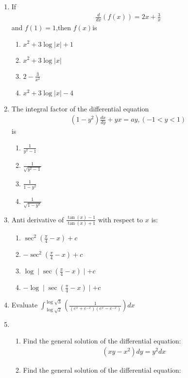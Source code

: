\documentclass{exam}
\providecommand{\abs}[1]{\lvert#1\rvert}
\providecommand{\brak}[1]{\ensuremath{\left(#1\right)}}
\begin{document}
\begin{enumerate}
    \item If 
    \begin{align}
        \frac{d}{dx}\brak{f(x)} = 2x+\frac{3}{x}
    \end{align}
    and $ f(1) = 1 $,then $f(x)$is
    \begin{enumerate}
        \item $ x^2 +3\log \abs{x} + 1 $
        \item $ x^2 + 3\log \abs{x} $ 
        \item $ 2 - \frac{3}{x^2}$
        \item $ x^2 +3\log \abs{x} - 4 $
    \end{enumerate}
    \item The integral factor of the differential equation
    \begin{align}
        \brak{1-y^2} \frac{dx}{dy} + yx = ay,(-1<y<1)
    \end{align}
    is
    \begin{enumerate}
        \item $ \frac{1}{y^2 - 1} $
        \item $ \frac{1}{\sqrt{y^2 - 1}}$
        \item $ \frac{1}{1-y^2}$
        \item $ \frac{1}{\sqrt{1-y^2}}$
    \end{enumerate}
    \item Anti derivative of $\frac{\tan(x)-1}{\tan(x)+1}$ with respect to $x$ is:
    \begin{enumerate}
        \item $ \sec^2(\frac{\pi}{4} - x)+ c$
        \item $ -\sec^2(\frac{\pi}{4} - x)+c$
        \item $ \log \mid\sec(\frac{\pi}{4}-x)\mid +c$
        \item $ -\log \mid\sec(\frac{\pi}{4}-x)\mid +c$
    \end{enumerate}
    \item Evaluate $\int^{\log\sqrt{3}}_{\log\sqrt{2}}\brak{\frac{1}{(e^x+e^{-x})(e^x-e^{-x})}}dx$
    \item
    \begin{enumerate}
        \item Find the general solution of the differential equation:
          \begin{align}
            \brak{xy-x^2}dy = y^2dx
          \end{align}
        \item Find the general solution of the  differential equation:

\end{enumerate}
\end{enumerate}
\end{document}
